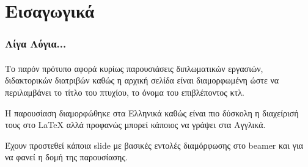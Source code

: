 \section{Εισαγωγικά}
 

\begin{frame}\frametitle{Λίγα Λόγια...}\framesubtitle{}
Το παρόν πρότυπο αφορά κυρίως παρουσιάσεις διπλωματικών εργασιών, διδακτορικών διατριβών καθώς η αρχική σελίδα είναι διαμορφωμένη ώστε να περιλαμβάνει το τίτλο του πτυχίου, το όνομα του επιβλέποντος κτλ.

Η παρουσίαση διαμορφώθηκε στα Ελληνικά καθώς είναι πιο δύσκολη η διαχείρισή τους στο {\LaTeX}  αλλά προφανώς μπορεί κάποιος να γράψει στα Αγγλικά. 

Έχουν προστεθεί κάποια slide με βασικές εντολές διαμόρφωσης στο beamer και για να φανεί η δομή της παρουσίασης.


\end{frame}
